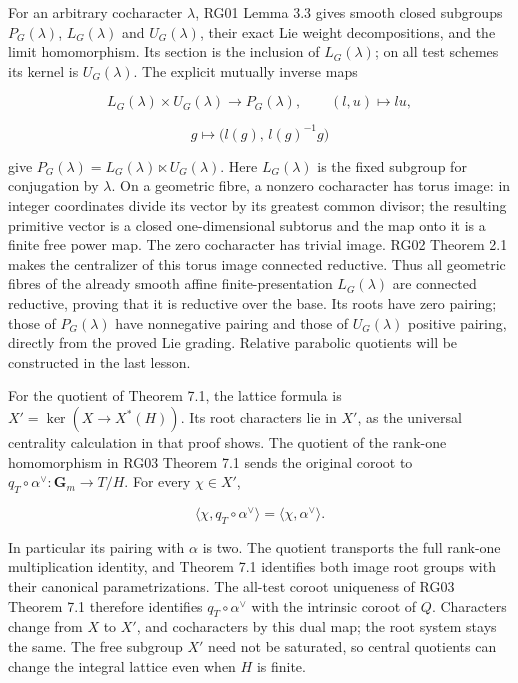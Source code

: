 \documentclass[11pt,a4paper,openany]{report}
\begin{document}
For an arbitrary cocharacter \(\lambda\), RG01 Lemma 3.3 gives smooth closed subgroups \(P_G(\lambda)\), \(L_G(\lambda)\) and \(U_G(\lambda)\), their exact Lie weight decompositions, and the limit homomorphism. Its section is the inclusion of \(L_G(\lambda)\); on all test schemes its kernel is \(U_G(\lambda)\). The explicit mutually inverse maps

\[
L_G(\lambda)\times U_G(\lambda)\longrightarrow P_G(\lambda),
\qquad(l,u)\longmapsto lu,
\]

\[
g\longmapsto\bigl(l(g),\,l(g)^{-1}g\bigr)
\]

give \(P_G(\lambda)=L_G(\lambda)\ltimes U_G(\lambda)\). Here \(L_G(\lambda)\) is the fixed subgroup for conjugation by \(\lambda\). On a geometric fibre, a nonzero cocharacter has torus image: in integer coordinates divide its vector by its greatest common divisor; the resulting primitive vector is a closed one-dimensional subtorus and the map onto it is a finite free power map. The zero cocharacter has trivial image. RG02 Theorem 2.1 makes the centralizer of this torus image connected reductive. Thus all geometric fibres of the already smooth affine finite-presentation \(L_G(\lambda)\) are connected reductive, proving that it is reductive over the base. Its roots have zero pairing; those of \(P_G(\lambda)\) have nonnegative pairing and those of \(U_G(\lambda)\) positive pairing, directly from the proved Lie grading. Relative parabolic quotients will be constructed in the last lesson.

For the quotient of Theorem 7.1, the lattice formula is \(X'=\ker(X\to X^*(H))\). Its root characters lie in \(X'\), as the universal centrality calculation in that proof shows. The quotient of the rank-one homomorphism in RG03 Theorem 7.1 sends the original coroot to \(q_T\circ\alpha^\vee:\mathbf G_m\to T/H\). For every \(\chi\in X'\),

\[
\langle\chi,q_T\circ\alpha^\vee\rangle
=\langle\chi,\alpha^\vee\rangle.
\]

In particular its pairing with \(\alpha\) is two. The quotient transports the full rank-one multiplication identity, and Theorem 7.1 identifies both image root groups with their canonical parametrizations. The all-test coroot uniqueness of RG03 Theorem 7.1 therefore identifies \(q_T\circ\alpha^\vee\) with the intrinsic coroot of \(Q\). Characters change from \(X\) to \(X'\), and cocharacters by this dual map; the root system stays the same. The free subgroup \(X'\) need not be saturated, so central quotients can change the integral lattice even when \(H\) is finite.
\end{document}
